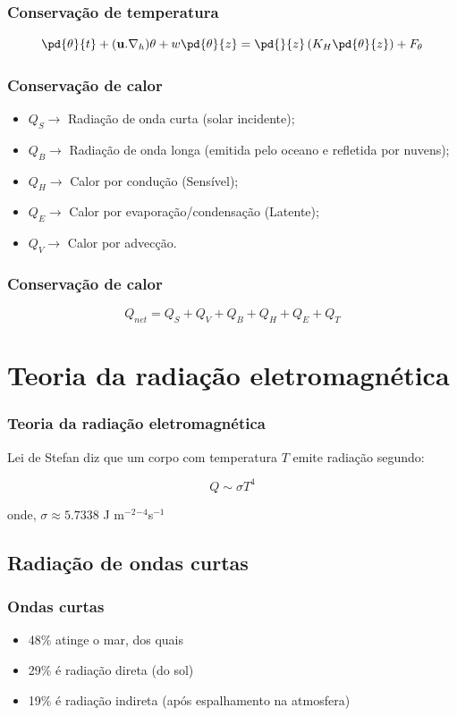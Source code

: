 \begin{frame}
\frametitle{Conservação de temperatura}
\[
  \pd{\theta}{t} + (\mathbf{u} . \nabla_h)\theta + w\pd{\theta}{z} = \pd{}{z}\left( K_H\pd{\theta}{z} \right) + F_{\theta}
\]
\end{frame}

\begin{frame}
  \frametitle{Conservação de calor}
  \begin{itemize}[<+-| alert@+>]
  \item $Q_S \rightarrow$ Radiação de onda curta (solar incidente);
  \item $Q_B \rightarrow$ Radiação de onda longa (emitida pelo oceano e
                          refletida por nuvens);
  \item $Q_H \rightarrow$ Calor por condução (Sensível);
  \item $Q_E \rightarrow$ Calor por evaporação/condensação (Latente);
  \item $Q_V \rightarrow$ Calor por advecção.
  \end{itemize}
\end{frame}

\begin{frame}
  \frametitle{Conservação de calor}
  \begin{block}{}
    \[
      Q_{net} = Q_S + Q_V + Q_B + Q_H + Q_E + Q_T
    \]
  \end{block}
\end{frame}

\section{Teoria da radiação eletromagnética}
\begin{frame}
  \frametitle{Teoria da radiação eletromagnética}
  Lei de Stefan diz que um corpo com temperatura $T$ emite radiação  segundo:
  \begin{block}{}
    \[
      Q \sim \sigma T^4
    \]
  \end{block}
  onde, $\sigma \approx 5.7338$ J m$^{-2}$$^{-4}$s$^{-1}$
\end{frame}

\subsection{Radiação de ondas curtas}
\begin{frame}
  \frametitle{Ondas curtas}
  \begin{itemize}[<+-| alert@+>]
    \item 48\% atinge o mar, dos quais
    \item 29\% é radiação direta (do sol)
    \item 19\% é radiação indireta (após espalhamento na atmosfera)
  \end{itemize}
\end{frame}

